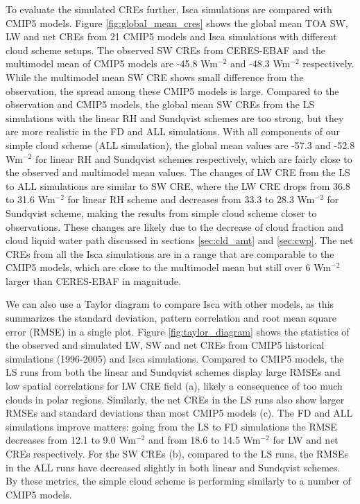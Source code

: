 To evaluate the simulated CREs further, Isca simulations are compared with CMIP5 models. Figure \ref{fig:global_mean_cres} shows the global mean TOA SW, LW and net CREs from 21 CMIP5 models and Isca simulations with different cloud scheme setups. The observed SW CREs from CERES-EBAF and the multimodel mean of CMIP5 models are -45.8 Wm$^{-2}$ and -48.3 Wm$^{-2}$ respectively. While the multimodel mean SW CRE shows small difference from the observation, the spread among these CMIP5 models is large. Compared to the observation and CMIP5 models, the global mean SW CREs from the LS simulations with the linear RH and Sundqvist schemes are too strong, but they are more realistic in the FD and ALL simulations. With all components of our simple cloud scheme (ALL simulation), the global mean values are -57.3 and -52.8 Wm$^{-2}$ for linear RH and Sundqvist schemes respectively, which are fairly close to the observed and multimodel mean values. The changes of LW CRE from the LS to ALL simulations are similar to SW CRE, where the LW CRE drops from 36.8 to 31.6 Wm$^{-2}$ for linear RH scheme and decreases from 33.3 to 28.3 Wm$^{-2}$ for Sundqvist scheme, making the results from simple cloud scheme closer to observations. These changes are likely due to the decrease of cloud fraction and cloud liquid water path discussed in sections \ref{sec:cld_amt} and \ref{sec:cwp}. The net CREs from all the Isca simulations are in a range that are comparable to the CMIP5 models, which are close to the multimodel mean but still over 6 Wm$^{-2}$ larger than CERES-EBAF in magnitude.

We can also use a Taylor diagram \citep{Taylor2001} to compare Isca with other models, as this summarizes the standard deviation, pattern correlation and root mean square error (RMSE) in a single plot. Figure \ref{fig:taylor_diagram} shows the statistics of the observed and simulated LW, SW and net CREs from CMIP5 historical simulations (1996-2005) and Isca simulations. Compared to CMIP5 models, the LS runs from both the linear and Sundqvist schemes display large RMSEs and low spatial correlations for LW CRE field (a), likely a consequence of too much clouds in polar regions. Similarly, the net CREs in the LS runs also show larger RMSEs and standard deviations than most CMIP5 models (c). The FD and ALL simulations improve matters: going from the LS to FD simulations the RMSE decreases from 12.1 to 9.0 Wm$^{-2}$ and from 18.6 to 14.5 Wm$^{-2}$ for LW and net CREs respectively. For the SW CREs (b), compared to the LS runs, the RMSEs in the ALL runs have decreased slightly in both linear and Sundqvist schemes. By these metrics, the  simple cloud scheme  is performing similarly to a number of CMIP5 models.

